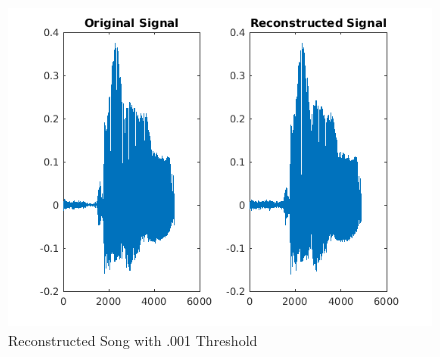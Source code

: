 \documentclass[11pt, a4paper]{article}
\begin{document}
\begin{figure}[H]
\hspace*{-2cm}    
    \centering
    \includegraphics[width=\textwidth]{ReconstructedImage94.png}
    \caption{Reconstructed Song with .001 Threshold}
\end{figure}
\end{document}
